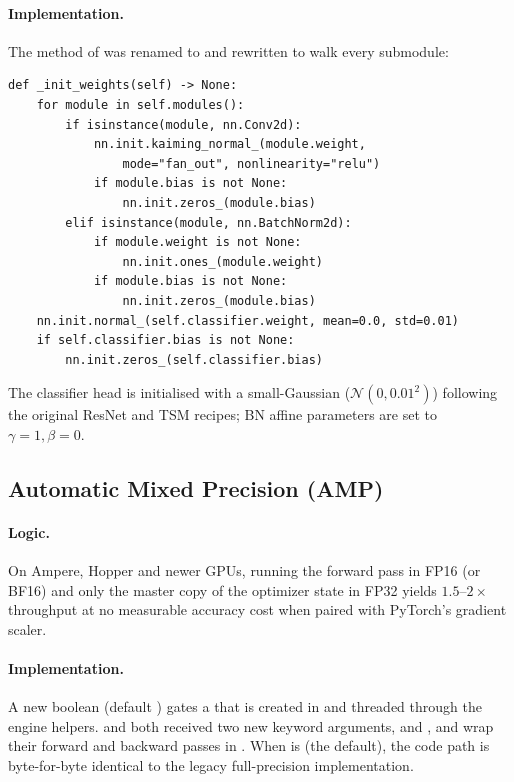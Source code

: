 \paragraph{Implementation.} The
 method of  was
renamed to  and rewritten to walk every submodule:

\begin{lstlisting}[style=py]
def _init_weights(self) -> None:
    for module in self.modules():
        if isinstance(module, nn.Conv2d):
            nn.init.kaiming_normal_(module.weight,
                mode="fan_out", nonlinearity="relu")
            if module.bias is not None:
                nn.init.zeros_(module.bias)
        elif isinstance(module, nn.BatchNorm2d):
            if module.weight is not None:
                nn.init.ones_(module.weight)
            if module.bias is not None:
                nn.init.zeros_(module.bias)
    nn.init.normal_(self.classifier.weight, mean=0.0, std=0.01)
    if self.classifier.bias is not None:
        nn.init.zeros_(self.classifier.bias)
\end{lstlisting}

The classifier head is initialised with a small-Gaussian
(\(\mathcal{N}(0, 0.01^2)\)) following the original ResNet and TSM
recipes; BN affine parameters are set to \(\gamma=1, \beta=0\).

\subsection{Automatic Mixed Precision (AMP)}
\label{sec:phase1:amp}

\paragraph{Logic.} On Ampere, Hopper and newer GPUs, running the forward
pass in FP16 (or BF16) and only the master copy of the optimizer state in
FP32 yields \(1.5\)--\(2\times\) throughput at no measurable accuracy
cost when paired with PyTorch's gradient scaler.

\paragraph{Implementation.} A new boolean 
(default ) gates a  that is
created in  and threaded through the engine helpers.
 and  both received two new
keyword arguments,  and , and wrap their
forward and backward passes in
. When
 is  (the default), the code path is
byte-for-byte identical to the legacy full-precision implementation.

